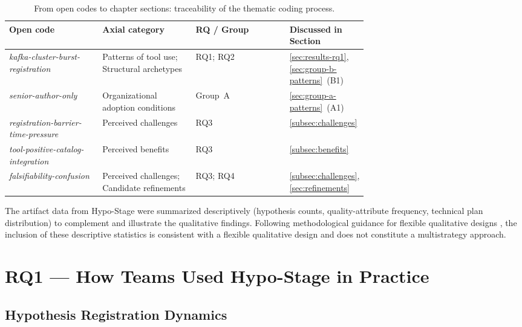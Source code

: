 \begin{table}[htbp]
\caption{From open codes to chapter sections: traceability of the thematic coding process.}
\label{tab:code-traceability}
\centering\small
\begin{tabular}{p{0.26\linewidth} p{0.26\linewidth} l p{0.17\linewidth}}
\toprule
\textbf{Open code} & \textbf{Axial category} & \textbf{RQ / Group} & \textbf{Discussed in Section} \\
\midrule
\textit{kafka-cluster-burst-registration}
  & Patterns of tool use; Structural archetypes
  & RQ1; RQ2
  & \ref{sec:results-rq1}, \ref{sec:group-b-patterns}~(B1) \\
\midrule
\textit{senior-author-only}
  & Organizational adoption conditions
  & Group~A
  & \ref{sec:group-a-patterns}~(A1) \\
\midrule
\textit{registration-barrier-time-pressure}
  & Perceived challenges
  & RQ3
  & \ref{subsec:challenges} \\
\midrule
\textit{tool-positive-catalog-integration}
  & Perceived benefits
  & RQ3
  & \ref{subsec:benefits} \\
\midrule
\textit{falsifiability-confusion}
  & Perceived challenges; Candidate refinements
  & RQ3; RQ4
  & \ref{subsec:challenges}, \ref{sec:refinements} \\
\bottomrule
\end{tabular}
\end{table}

The artifact data from Hypo-Stage were summarized descriptively (hypothesis
counts, quality-attribute frequency, technical plan distribution) to complement
and illustrate the qualitative findings. Following methodological guidance for flexible qualitative designs \citep{robson2016}, the
inclusion of these descriptive statistics is consistent with a flexible
qualitative design and does not constitute a multistrategy approach.

\section{RQ1 — How Teams Used Hypo-Stage in Practice}
\label{sec:rq1-results}
\label{sec:results-rq1}

\subsection{Hypothesis Registration Dynamics}
\label{subsec:registration-dynamics}

